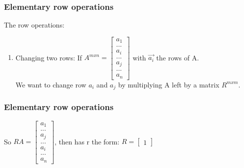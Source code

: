 \begin{frame}
	\frametitle{Elementary row operations}
	The row operations:
	\begin{enumerate}
		\item Changing two rows:
		If $A^{mxn}=\begin{bmatrix}
		a_1\\...\\a_i\\...\\a_j\\...\\a_n 
		\end{bmatrix}$ with $\overrightarrow{a_i}$ the rows of A. \\
		We want to change row $a_i$ and $a_j$ by multiplying A left by a matrix $R^{mxm}$. 
	\end{enumerate}
\end{frame}

\begin{frame}
	\frametitle{Elementary row operations}
		So $RA=\begin{bmatrix}
		a_1\\...\\a_j\\...\\a_i\\...\\a_n 
		\end{bmatrix}$, then has r the form: $R=\begin{bmatrix}
		1
		\end{bmatrix}$
\end{frame}
